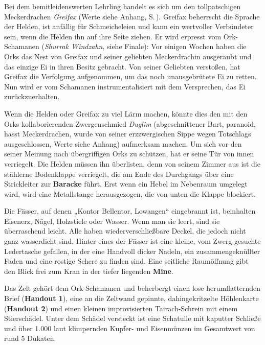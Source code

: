 Bei dem bemitleidenswerten Lehrling handelt es sich um den tollpatschigen Meckerdrachen \textit{Greifax} (Werte siehe Anhang, S.\,\pageref{greifax}).
Greifax beherrscht die Sprache der Helden, ist anfällig für Schmeicheleien und kann ein wertvoller Verbündeter sein, wenn die Helden ihn auf ihre Seite ziehen.
Er wird erpresst vom Ork-Schamanen (\textit{Shurrak Windzahn}, siehe Finale):
Vor einigen Wochen haben die Orks das Nest von Greifax und seiner geliebten Meckerdrachin ausgeraubt und das einzige Ei in ihren Besitz gebracht.
Von seiner Geliebten verstoßen, hat Greifax die Verfolgung aufgenommen, um das noch unausgebrütete Ei zu retten.
Nun wird er vom Schamanen instrumentalisiert mit dem Versprechen, das Ei zurückzuerhalten.

Wenn die Helden oder Greifax zu viel Lärm machen, könnte dies den mit den Orks kollaborierenden Zwergenschmied \textit{Duglim} (abgeschnittener Bart, paranoid, hasst Meckerdrachen, wurde von seiner erzzwergischen Sippe wegen Totschlags ausgeschlossen, Werte siehe Anhang) aufmerksam machen.
Um sich vor den seiner Meinung nach übergriffigen Orks zu schützen, hat er seine Tür von innen verriegelt.
Die Helden müssen ihn überlisten, denn von seinem Zimmer aus ist die stählerne Bodenklappe verriegelt, die am Ende des Durchgangs über eine Strickleiter zur \textbf{Baracke} führt.
Erst wenn ein Hebel im Nebenraum umgelegt wird, wird eine Metallstange herausgezogen, die von unten die Klappe blockiert.


Die Fässer, auf denen „Kontor Bellentor, Lowangen“ eingebrannt ist, beinhalten Eisenerz, Nägel, Holzstiele oder Wasser. Wenn man sie leert, sind sie überraschend leicht. Alle haben wiederverschließbare Deckel, die jedoch nicht ganz wasserdicht sind. Hinter eines der Fässer ist eine kleine, vom Zwerg gesuchte Ledertasche gefallen, in der eine Handvoll dicker Nadeln, ein zusammengeknüllter Faden und eine rostige Schere zu finden sind. Eine seitliche Raumöffnung gibt den Blick frei zum Kran in der tiefer liegenden \textbf{Mine}.


Das Zelt gehört dem Ork-Schamanen und beherbergt einen lose herumflatternden Brief (\textbf{Handout 1}), eine an die Zeltwand gepinnte, dahingekritzelte Höhlenkarte (\textbf{Handout 2}) und einen kleinen improvisierten Tairach-Schrein mit einem Stierschädel.
Unter dem Schädel versteckt ist eine Schatulle mit kaputter Schließe und über 1.000 laut klimpernden Kupfer- und Eisenmünzen im Gesamtwert von rund 5 Dukaten.

